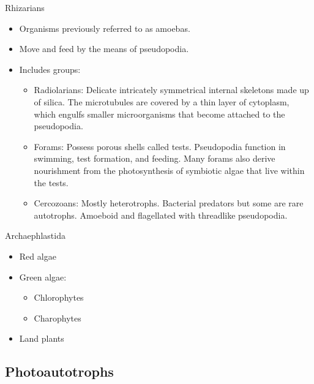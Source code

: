 \documentclass[ignorenonframetext,aspectratio=169]{beamer}
\providecommand{\tightlist}{%
  \setlength{\itemsep}{0pt}\setlength{\parskip}{0pt}}
\begin{document}
\begin{frame}{Rhizarians}
\protect\hypertarget{rhizarians}{}

\begin{itemize}
\tightlist
\item
  Organisms previously referred to as amoebas.
\item
  Move and feed by the means of pseudopodia.
\item
  Includes groups:

  \begin{itemize}
  \tightlist
  \item
    Radiolarians: Delicate intricately symmetrical internal skeletons
    made up of silica. The microtubules are covered by a thin layer of
    cytoplasm, which engulfs smaller microorganisms that become attached
    to the pseudopodia.
  \item
    Forams: Possess porous shells called tests. Pseudopodia function in
    swimming, test formation, and feeding. Many forams also derive
    nourishment from the photosynthesis of symbiotic algae that live
    within the tests.
  \item
    Cercozoans: Mostly heterotrophs. Bacterial predators but some are
    rare autotrophs. Amoeboid and flagellated with threadlike
    pseudopodia.
  \end{itemize}
\end{itemize}

\end{frame}

\begin{frame}{Archaephlastida}
\protect\hypertarget{archaephlastida}{}

\begin{itemize}
\tightlist
\item
  Red algae
\item
  Green algae:

  \begin{itemize}
  \tightlist
  \item
    Chlorophytes
  \item
    Charophytes
  \end{itemize}
\item
  Land plants
\end{itemize}

\end{frame}

\hypertarget{photoautotrophs}{%
\subsection{Photoautotrophs}\label{photoautotrophs}}
\end{document}
